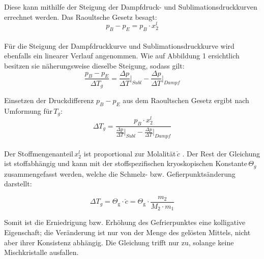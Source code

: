 \documentclass[12pt,a4paper,titlepage,headinclude,bibtotoc]{scrartcl}
\begin{document}
\newpage

Diese kann mithilfe der Steigung der Dampfdruck- und Sublimationsdruckkurven errechnet werden. Das Raoultsche Gesetz besagt:\\

\begin{equation}
p_B - p_E = p_B \cdot x_2^l
\end{equation}
\\

Für die Steigung der Dampfdruckkurve und Sublimationsdruckkurve wird ebenfalls ein linearer Verlauf angenommen. Wie auf Abbildung 1 ersichtlich besitzen sie näherungsweise dieselbe Steigung, sodass gilt:\\

\begin{equation}
\dfrac{p_B - p_E}{\Delta T_g} = \frac{\Delta p}{\Delta T}\bigg \vert_{Subl} - \frac{\Delta p}{\Delta T}\bigg \vert_{Dampf}
\end{equation}

Einsetzen der Druckdifferenz $p_B - p_E$ aus dem Raoultschen Gesetz ergibt nach Umformung für\,$T_g$:\\

\begin{equation}
\Delta T_g =\dfrac{p_B \cdot x_2^l}{\frac{\Delta p}{\Delta T}\bigg \vert_{Subl} - \frac{\Delta p}{\Delta T}\bigg \vert_{Dampf}}
\end{equation}
\\

Der Stoffmengenanteil\,$x_2^l$ ist proportional zur Molalität\,$\check c$ . Der Rest der Gleichung ist stoffabhängig und kann mit der stoffspezifischen kryoskopischen Konstante\,$\Theta_g$ zusammengefasst werden, welche die Schmelz- bzw. Gefierpunktsänderung darstellt:

\begin{equation}
\Delta T_g = \Theta_\mathrm{g} \cdot \check c = \Theta_\mathrm{g} \cdot \frac{m_\mathrm{2}}{M_\mathrm{2} \cdot m_\mathrm{1}}
\end{equation}

Somit ist die Erniedrigung bzw. Erhöhung des Gefrierpunktes eine kolligative Eigenschaft; die Veränderung ist nur von der Menge des gelösten Mittels, nicht aber ihrer Konsistenz abhängig. Die Gleichung trifft nur zu, solange keine Mischkristalle ausfallen.\\

\end{document}
